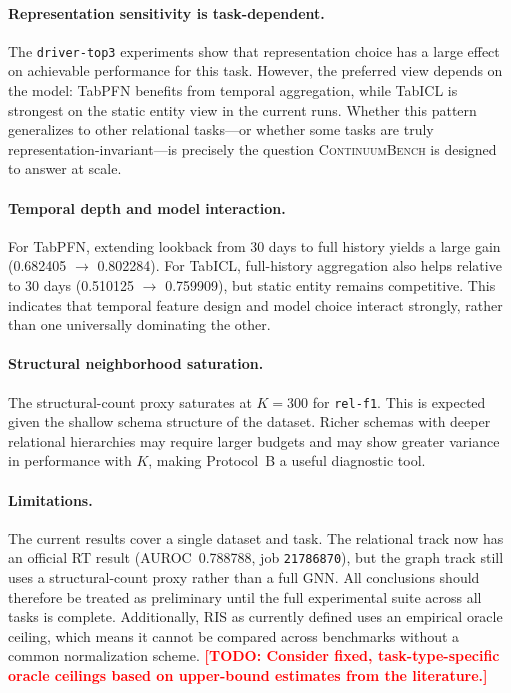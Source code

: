 \documentclass[11pt]{article}
\newcommand{\cb}{\textsc{ContinuumBench}}
\newcommand{\todo}[1]{\textcolor{red}{\textbf{[TODO: #1]}}}
\begin{document}
\paragraph{Representation sensitivity is task-dependent.}
The \texttt{driver-top3} experiments show that representation choice
has a large effect on achievable performance for this task.
However, the preferred view depends on the model: TabPFN benefits from
temporal aggregation, while TabICL is strongest on the static entity
view in the current runs.
Whether this pattern generalizes to other relational tasks---or whether
some tasks are truly representation-invariant---is precisely the
question \cb{} is designed to answer at scale.

\paragraph{Temporal depth and model interaction.}
For TabPFN, extending lookback from 30 days to full history yields a
large gain (0.682405 $\to$ 0.802284). For TabICL, full-history
aggregation also helps relative to 30 days
(0.510125 $\to$ 0.759909), but static entity remains competitive.
This indicates that temporal feature design and model choice interact
strongly, rather than one universally dominating the other.

\paragraph{Structural neighborhood saturation.}
The structural-count proxy saturates at $K = 300$ for \texttt{rel-f1}.
This is expected given the shallow schema structure of the dataset.
Richer schemas with deeper relational hierarchies may require larger
budgets and may show greater variance in performance with $K$, making
Protocol~B a useful diagnostic tool.

\paragraph{Limitations.}
The current results cover a single dataset and task.
The relational track now has an official RT result (AUROC~0.788788,
job \texttt{21786870}), but the graph track still uses a
structural-count proxy rather than a full GNN.
All conclusions should therefore be treated as preliminary until the
full experimental suite across all tasks is complete.
Additionally, RIS as currently defined uses an empirical oracle
ceiling, which means it cannot be compared across benchmarks without
a common normalization scheme.
\todo{Consider fixed, task-type-specific oracle ceilings based on
upper-bound estimates from the literature.}
\end{document}
